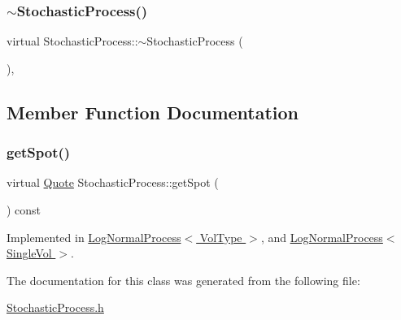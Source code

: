 \subsubsection{\texorpdfstring{$\sim$\+Stochastic\+Process()}{~StochasticProcess()}}
{\footnotesize\ttfamily virtual Stochastic\+Process\+::$\sim$\+Stochastic\+Process (\begin{DoxyParamCaption}{ }\end{DoxyParamCaption})\hspace{0.3cm}{\ttfamily [inline]}, {\ttfamily [virtual]}}



\subsection{Member Function Documentation}
\hypertarget{class_stochastic_process_aad2ef51ca4bc2fe5f33a73e8f0ee361e}{}\label{class_stochastic_process_aad2ef51ca4bc2fe5f33a73e8f0ee361e} 
\subsubsection{\texorpdfstring{get\+Spot()}{getSpot()}}
{\footnotesize\ttfamily virtual \hyperlink{_name_def_8h_a642a6c5fd87319d922637de0e0bb0305}{Quote} Stochastic\+Process\+::get\+Spot (\begin{DoxyParamCaption}{ }\end{DoxyParamCaption}) const\hspace{0.3cm}{\ttfamily [pure virtual]}}



Implemented in \hyperlink{class_log_normal_process_a2c01b829c59e9b6156f0e34b3632c800}{Log\+Normal\+Process$<$ Vol\+Type $>$}, and \hyperlink{class_log_normal_process_a2c01b829c59e9b6156f0e34b3632c800}{Log\+Normal\+Process$<$ Single\+Vol $>$}.



The documentation for this class was generated from the following file\+:\begin{DoxyCompactItemize}
\item 
\hyperlink{_stochastic_process_8h}{Stochastic\+Process.\+h}\end{DoxyCompactItemize}

